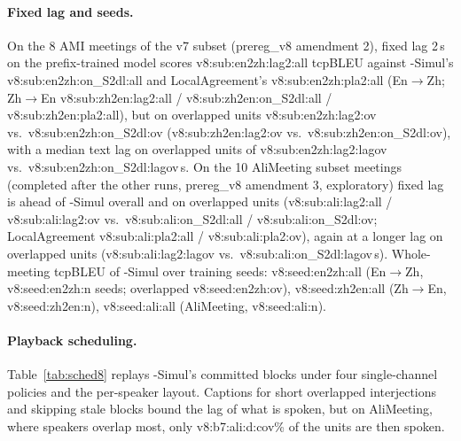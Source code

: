 \paragraph{Fixed lag and seeds.} On the 8 AMI meetings of the v7 subset (prereg\_v8 amendment 2), fixed lag 2\,s on the
prefix-trained model scores \num{v8:sub:en2zh:lag2:all} tcpBLEU against \sys{}-Simul's \num{v8:sub:en2zh:on_S2dl:all} and
LocalAgreement's \num{v8:sub:en2zh:pla2:all} (En$\rightarrow$Zh; Zh$\rightarrow$En \num{v8:sub:zh2en:lag2:all} /
\num{v8:sub:zh2en:on_S2dl:all} / \num{v8:sub:zh2en:pla2:all}), but on overlapped units \num{v8:sub:en2zh:lag2:ov} vs.\
\num{v8:sub:en2zh:on_S2dl:ov} (\num{v8:sub:zh2en:lag2:ov} vs.\ \num{v8:sub:zh2en:on_S2dl:ov}), with a median text lag on
overlapped units of \num{v8:sub:en2zh:lag2:lagov} vs.\ \num{v8:sub:en2zh:on_S2dl:lagov}\,s. On the 10 AliMeeting subset
meetings (completed after the other runs, prereg\_v8 amendment 3, exploratory) fixed lag is ahead of \sys{}-Simul overall
and on overlapped units (\num{v8:sub:ali:lag2:all} / \num{v8:sub:ali:lag2:ov} vs.\ \num{v8:sub:ali:on_S2dl:all} /
\num{v8:sub:ali:on_S2dl:ov}; LocalAgreement \num{v8:sub:ali:pla2:all} / \num{v8:sub:ali:pla2:ov}), again at a longer lag on
overlapped units (\num{v8:sub:ali:lag2:lagov} vs.\ \num{v8:sub:ali:on_S2dl:lagov}\,s). Whole-meeting tcpBLEU of
\sys{}-Simul over training seeds: \num{v8:seed:en2zh:all} (En$\rightarrow$Zh, \num{v8:seed:en2zh:n} seeds; overlapped
\num{v8:seed:en2zh:ov}), \num{v8:seed:zh2en:all} (Zh$\rightarrow$En, \num{v8:seed:zh2en:n}), \num{v8:seed:ali:all}
(AliMeeting, \num{v8:seed:ali:n}).

\paragraph{Playback scheduling.} Table~\ref{tab:sched8} replays \sys{}-Simul's committed blocks under four single-channel
policies and the per-speaker layout. Captions for short overlapped interjections and skipping stale blocks bound the lag
of what is spoken, but on AliMeeting, where speakers overlap most, only \num{v8:b7:ali:d:cov}\% of the units are then
spoken.



